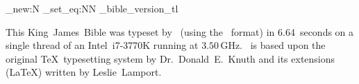 \documentclass[
  twoside,
  ]{bible}
\begin{document}
\backmatter\onecolumn
\ExplSyntaxOn
\tl_new:N \bibleversion
\tl_set_eq:NN \bibleversion \g_bible_version_tl
\ExplSyntaxOff




\thispagestyle{empty}
\null\vfil\noindent
This King~James~Bible was typeset by \XeTeX\ (using the \XeLaTeX\ format) in
6.64~seconds on a single thread of an Intel~\mbox{i7-3770K} running at
$3.50\,\mathrm{GHz}$.  \XeLaTeX\ is based upon the original \TeX\
typesetting system by Dr.~Donald~E.~Knuth and its extensions (\LaTeX)
written by Leslie~Lamport.
\vfil\vfil
\end{document}
